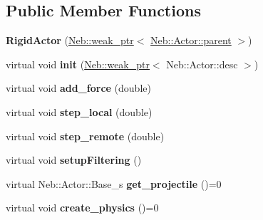 \subsection*{\-Public \-Member \-Functions}
\begin{DoxyCompactItemize}
\item 
\hypertarget{classNeb_1_1Actor_1_1RigidActor_acdac9f4b947d14a750a9cb77cc612570}{{\bfseries \-Rigid\-Actor} (\hyperlink{classNeb_1_1weak__ptr}{\-Neb\-::weak\-\_\-ptr}$<$ \hyperlink{classNeb_1_1Actor_1_1parent}{\-Neb\-::\-Actor\-::parent} $>$)}\label{classNeb_1_1Actor_1_1RigidActor_acdac9f4b947d14a750a9cb77cc612570}

\item 
\hypertarget{classNeb_1_1Actor_1_1RigidActor_abf7c5bf09cee03a13bb073fa6f7f3317}{virtual void {\bfseries init} (\hyperlink{classNeb_1_1weak__ptr}{\-Neb\-::weak\-\_\-ptr}$<$ \-Neb\-::\-Actor\-::desc $>$)}\label{classNeb_1_1Actor_1_1RigidActor_abf7c5bf09cee03a13bb073fa6f7f3317}

\item 
\hypertarget{classNeb_1_1Actor_1_1RigidActor_a8aa2a620e7a3088219049fa032b35854}{virtual void {\bfseries add\-\_\-force} (double)}\label{classNeb_1_1Actor_1_1RigidActor_a8aa2a620e7a3088219049fa032b35854}

\item 
\hypertarget{classNeb_1_1Actor_1_1RigidActor_a31a3b08505a589ef8e796265725df8d6}{virtual void {\bfseries step\-\_\-local} (double)}\label{classNeb_1_1Actor_1_1RigidActor_a31a3b08505a589ef8e796265725df8d6}

\item 
\hypertarget{classNeb_1_1Actor_1_1RigidActor_a60b4de7ce5d629dbcb79050ef97a42a8}{virtual void {\bfseries step\-\_\-remote} (double)}\label{classNeb_1_1Actor_1_1RigidActor_a60b4de7ce5d629dbcb79050ef97a42a8}

\item 
\hypertarget{classNeb_1_1Actor_1_1RigidActor_aeba39e9899ccf3fd7f03fde94311f849}{virtual void {\bfseries setup\-Filtering} ()}\label{classNeb_1_1Actor_1_1RigidActor_aeba39e9899ccf3fd7f03fde94311f849}

\item 
\hypertarget{classNeb_1_1Actor_1_1RigidActor_aa40a9de3bdbfd5696f72cd1399ea3327}{virtual \-Neb\-::\-Actor\-::\-Base\-\_\-s {\bfseries get\-\_\-projectile} ()=0}\label{classNeb_1_1Actor_1_1RigidActor_aa40a9de3bdbfd5696f72cd1399ea3327}

\item 
\hypertarget{classNeb_1_1Actor_1_1RigidActor_a9aeda58149838be324376f1e42eeb7de}{virtual void {\bfseries create\-\_\-physics} ()=0}\label{classNeb_1_1Actor_1_1RigidActor_a9aeda58149838be324376f1e42eeb7de}


\end{DoxyCompactItemize}

